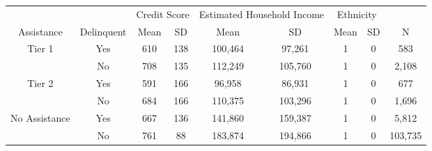 \begin{tabular}{ccccccccc}
\toprule 
\midrule 
\multicolumn{2}{c}{} & \multicolumn{2}{c}{Credit Score} & \multicolumn{2}{c}{Estimated Household Income} & \multicolumn{2}{c}{Ethnicity} &  \\
 \cmidrule(lr){3-4} \cmidrule(lr){5-6} \cmidrule(lr){7-8} 
Assistance & Delinquent & Mean & SD & Mean & SD & Mean & SD & N \\
\midrule 
Tier 1 & Yes & 610 & 138 & 100,464 & 97,261 & 1 & 0 & 583 \\
 & No & 708 & 135 & 112,249 & 105,760 & 1 & 0 & 2,108 \\
\midrule 
Tier 2 & Yes & 591 & 166 & 96,958 & 86,931 & 1 & 0 & 677 \\
 & No & 684 & 166 & 110,375 & 103,296 & 1 & 0 & 1,696 \\
\midrule 
No Assistance & Yes & 667 & 136 & 141,860 & 159,387 & 1 & 0 & 5,812 \\
 & No & 761 & 88 & 183,874 & 194,866 & 1 & 0 & 103,735 \\
\midrule 
\bottomrule 
\end{tabular}
